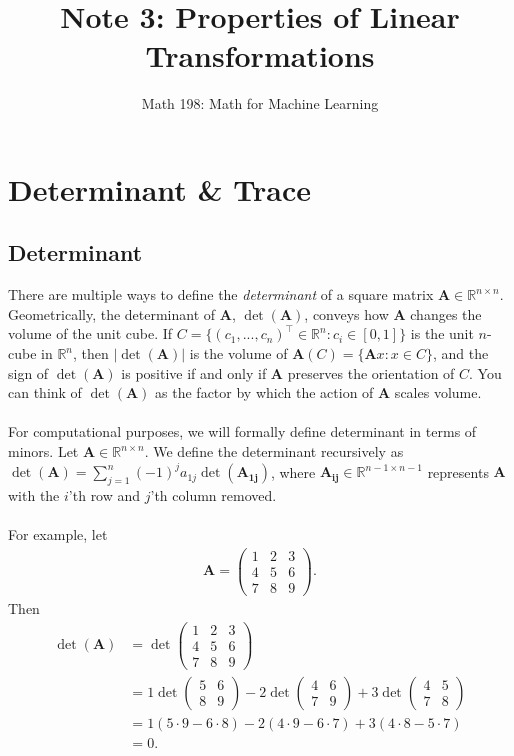 \documentclass{article}
\title{Note 3: Properties of Linear Transformations}
\author{Math 198: Math for Machine Learning}
\date{}
\begin{document}
\maketitle

\section{Determinant \& Trace}

\subsection{Determinant}
There are multiple ways to define the \textit{determinant }of a square matrix $\mathbf{A} \in \mathbb{R}^{n \times n}$. Geometrically, the determinant of $\mathbf{A}$, $\det(\mathbf{A})$, conveys how $\mathbf{A}$ changes the volume of the unit cube. If $C = \{ (c_1, ... , c_n)^\top \in \mathbb{R}^n : c_i \in [0,1] \}$ is the unit $n$-cube in $\mathbb{R}^n$, then $|\det(\mathbf{A})|$ is the volume of $\mathbf{A}(C) = \{\mathbf{A}x: x \in C\}$, and the sign of $\det(\mathbf{A})$ is positive if and only if $\mathbf{A}$ preserves the orientation of $C$. You can think of $\det(\mathbf{A})$ as the factor by which the action of $\mathbf{A}$ scales volume. 
\\ \\
For computational purposes, we will formally define determinant in terms of minors. Let $\mathbf{A} \in \mathbb{R}^{n \times n}$. We define the determinant recursively as $\det(\mathbf{A}) = \sum_{j = 1}^n (-1)^j a_{1j} \det(\mathbf{A_{1j}})$, where $\mathbf{A_{ij}} \in \mathbb{R}^{n-1 \times n-1}$ represents $\mathbf{A}$ with the $i$'th row and $j$'th column removed. 
\\ \\
For example, let 
\begin{gather*}
\mathbf{A} =
\begin{pmatrix}
1 & 2 & 3 \\
4 & 5 & 6 \\
7 & 8 & 9
\end{pmatrix}.
\end{gather*}
Then 
\begin{align*}
\det(\mathbf{A}) &=
\det\begin{pmatrix}
1 & 2 & 3 \\
4 & 5 & 6 \\
7 & 8 & 9
\end{pmatrix} \\
&= 1\det\begin{pmatrix}
5 & 6 \\
8 & 9
\end{pmatrix}
- 2\det\begin{pmatrix}
4 & 6 \\
7 & 9
\end{pmatrix}
+ 3\det\begin{pmatrix}
4 & 5 \\
7 & 8 
\end{pmatrix} \\
&= 1(5\cdot 9 - 6 \cdot 8) - 2(4 \cdot 9 - 6 \cdot 7) + 3(4 \cdot 8 - 5 \cdot 7) \\
&= 0.
\end{align*}
\end{document}

